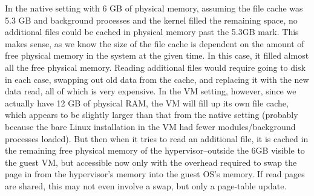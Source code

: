 \documentclass[letterpaper,twocolumn,10pt]{article}
\begin{document}
In the native setting with 6 GB of physical memory, assuming the file cache was 5.3 GB and background processes and the kernel filled the remaining space, no additional files could be cached in physical memory past the 5.3GB mark. 
This makes sense, as we know the size of the file cache is dependent on the amount of free physical memory in the system at the given time. 
In this case, it filled almost all the free physical memory. 
Reading additional files would require going to disk in each case, swapping out old data from the cache, and replacing it with the new data read, all of which is very expensive. 
In the VM setting, however, since we actually have 12 GB of physical RAM, the VM will fill up its own file cache, which appears to be slightly larger than that from the native setting (probably because the bare Linux installation in the VM had fewer modules/background processes loaded). 
But then when it tries to read an additional file, it is cached in the remaining free physical memory of the hypervisor--outside the 6GB visible to the guest VM, but accessible now only with the overhead required to swap the page in from the hypervisor's memory into the guest OS's memory. 
If read pages are shared, this may not even involve a swap, but only a page-table update. 
\end{document}
